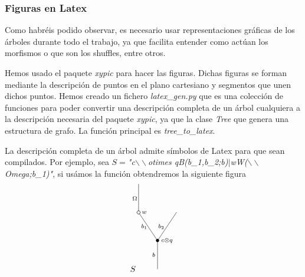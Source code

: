 \documentclass[../main.tex]{subfiles}
\begin{document}
\subsubsection*{Figuras en Latex}
Como habr\'eis podido observar, es necesario usar representaciones gr\'aficas de los \'arboles durante todo el trabajo, ya que facilita entender como act\'uan los morfismos o que son los shuffles, entre otros.

Hemos usado el paquete \emph{xypic} para hacer las figuras. Dichas figuras se forman mediante la descripci\'on de puntos en el plano cartesiano y segmentos que unen dichos puntos. Hemos creado un fichero \emph{latex\_gen.py} que es una colecci\'on de funciones para poder convertir una descripci\'on completa de un \'arbol cualquiera a la descripci\'on necesaria del paquete \emph{xypic}, ya que la clase \emph{Tree} que genera una estructura de grafo.
La funci\'on principal es \emph{tree\_to\_latex}.

La descripci\'on completa de un \'arbol admite s\'imbolos de Latex para que sean compilados. Por ejemplo, sea $S=$\emph{"c$\backslash\backslash$otimes qB(b\_1,b\_2;b)$|$wW($\backslash\backslash$Omega;b\_1)"}, si us\'amos la funci\'on obtendremos la siguiente figura
$$
\xy
<0.08cm, 0cm>:
(0.0, 0.0)*{}="1"; %
(0.0, 15.0)*=0{\bullet}="2"; %
(-10.0, 30.0)*\cir<2pt>{}="3"; %
(-10.0, 45.0)*{}="4"; %
(10.0, 30.0)*{}="5"; %
"1";"2" **\dir{-};
"2";"3" **\dir{-};
"3";"4" **\dir{-};
"2";"5" **\dir{-};
(5.0, 15.0)*=0{\scriptstyle c\otimes q};
(-7.0, 30.0)*=0{\scriptstyle w};
(-2.0, 7.5)*=0{\scriptstyle b};
(-7.0, 22.5)*=0{\scriptstyle b_1};
(-12.0, 37.5)*=0{\scriptstyle \Omega};
(2, 22.5)*=0{\scriptstyle b_2};
(-13,0)*{S};
\endxy
$$
\end{document}
